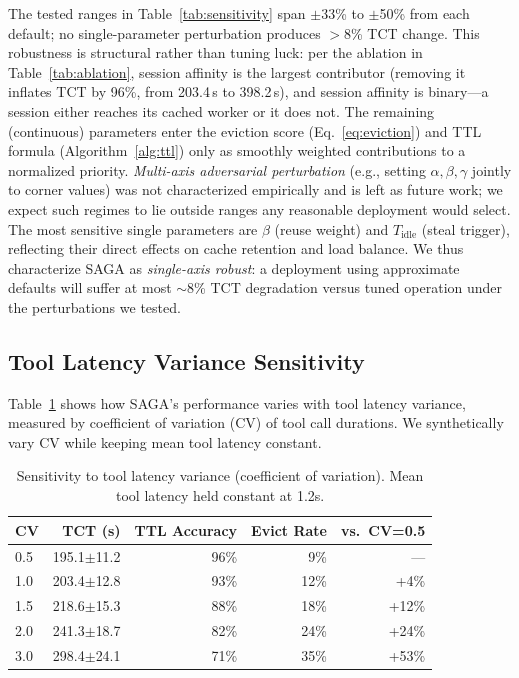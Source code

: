 \documentclass[sigconf]{acmart}
\newcommand{\sysname}{SAGA\xspace}
\begin{document}
The tested ranges in Table~\ref{tab:sensitivity} span $\pm$33\% to $\pm$50\% from each default; no single-parameter perturbation produces $>$8\% TCT change. This robustness is structural rather than tuning luck: per the ablation in Table~\ref{tab:ablation}, session affinity is the largest contributor (removing it inflates TCT by 96\%, from 203.4\,s to 398.2\,s), and session affinity is binary---a session either reaches its cached worker or it does not. The remaining (continuous) parameters enter the eviction score (Eq.~\ref{eq:eviction}) and TTL formula (Algorithm~\ref{alg:ttl}) only as smoothly weighted contributions to a normalized priority. \emph{Multi-axis adversarial perturbation} (e.g., setting $\alpha,\beta,\gamma$ jointly to corner values) was not characterized empirically and is left as future work; we expect such regimes to lie outside ranges any reasonable deployment would select. The most sensitive single parameters are $\beta$ (reuse weight) and $T_\text{idle}$ (steal trigger), reflecting their direct effects on cache retention and load balance. We thus characterize \sysname as \emph{single-axis robust}: a deployment using approximate defaults will suffer at most $\sim$8\% TCT degradation versus tuned operation under the perturbations we tested.

\subsection{Tool Latency Variance Sensitivity}
\label{sec:tool-variance}

Table~\ref{tab:tool-variance} shows how \sysname's performance varies with tool latency variance, measured by coefficient of variation (CV) of tool call durations. We synthetically vary CV while keeping mean tool latency constant.

\begin{table}[t]
    \centering
    \caption{Sensitivity to tool latency variance (coefficient of variation). Mean tool latency held constant at 1.2s.}
    \label{tab:tool-variance}
    \begin{tabular}{lrrrr}
    \toprule
    \textbf{CV} & \textbf{TCT (s)} & \textbf{TTL Accuracy} & \textbf{Evict Rate} & \textbf{vs.\ CV=0.5} \\
    \midrule
    0.5 & 195.1\scriptsize{$\pm$11.2} & 96\% & 9\% & --- \\
    1.0 & 203.4\scriptsize{$\pm$12.8} & 93\% & 12\% & +4\% \\
    1.5 & 218.6\scriptsize{$\pm$15.3} & 88\% & 18\% & +12\% \\
    2.0 & 241.3\scriptsize{$\pm$18.7} & 82\% & 24\% & +24\% \\
    3.0 & 298.4\scriptsize{$\pm$24.1} & 71\% & 35\% & +53\% \\
    \bottomrule
    \end{tabular}
\end{table}
\end{document}
